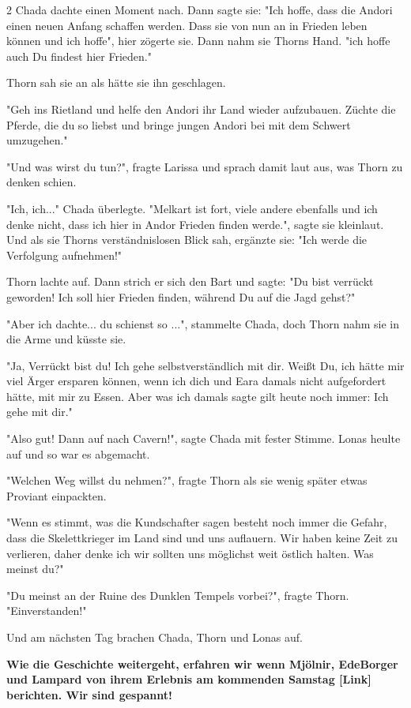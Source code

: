 \documentclass[10pt, a4paper, oneside]{book}
\begin{document}
\begin{multicols}{2}
Chada dachte einen Moment nach. Dann sagte sie: "Ich hoffe, dass die Andori einen neuen Anfang schaffen werden. Dass sie von nun an in Frieden leben können und ich hoffe", hier zögerte sie. Dann nahm sie Thorns Hand. "ich hoffe auch Du findest hier Frieden."

Thorn sah sie an als hätte sie ihn geschlagen.

"Geh ins Rietland und helfe den Andori ihr Land wieder aufzubauen. Züchte die Pferde, die du so liebst und bringe jungen Andori bei mit dem Schwert umzugehen."

"Und was wirst du tun?", fragte Larissa und sprach damit laut aus, was Thorn zu denken schien.

"Ich, ich..." Chada überlegte. "Melkart ist fort, viele andere ebenfalls und ich denke nicht, dass ich hier in Andor Frieden finden werde.", sagte sie kleinlaut. Und als sie Thorns verständnislosen Blick sah, ergänzte sie: "Ich werde die Verfolgung aufnehmen!"

Thorn lachte auf. Dann strich er sich den Bart und sagte: "Du bist verrückt geworden! Ich soll hier Frieden finden, während Du auf die Jagd gehst?"

"Aber ich dachte... du schienst so ...", stammelte Chada, doch Thorn nahm sie in die Arme und küsste sie.

"Ja, Verrückt bist du! Ich gehe selbstverständlich mit dir. Weißt Du, ich hätte mir viel Ärger ersparen können, wenn ich dich und Eara damals nicht aufgefordert hätte, mit mir zu Essen. Aber was ich damals sagte gilt heute noch immer: Ich gehe mit dir."

"Also gut! Dann auf nach Cavern!", sagte Chada mit fester Stimme. Lonas heulte auf und so war es abgemacht.

"Welchen Weg willst du nehmen?", fragte Thorn als sie wenig später etwas Proviant einpackten.

"Wenn es stimmt, was die Kundschafter sagen besteht noch immer die Gefahr, dass die Skelettkrieger im Land sind und uns auflauern. Wir haben keine Zeit zu verlieren, daher denke ich wir sollten uns möglichst weit östlich halten. Was meinst du?"

"Du meinst an der Ruine des Dunklen Tempels vorbei?", fragte Thorn. "Einverstanden!"

Und am nächsten Tag brachen Chada, Thorn und Lonas auf.

\textbf{Wie die Geschichte weitergeht, erfahren wir wenn Mjölnir, EdeBorger und Lampard von ihrem Erlebnis am kommenden Samstag [Link] berichten. Wir sind gespannt!}










\end{multicols}
\end{document}
